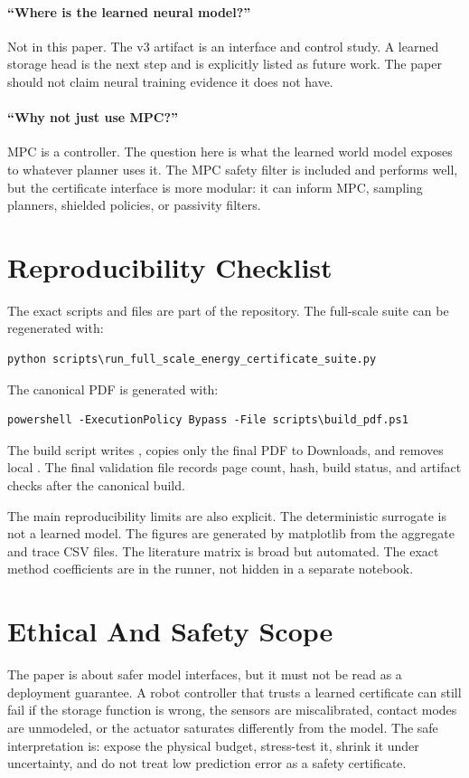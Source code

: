 \documentclass{article}
\begin{document}
\paragraph{``Where is the learned neural model?''}
Not in this paper. The v3 artifact is an interface and control study. A learned storage head is the next step and is explicitly listed as future work. The paper should not claim neural training evidence it does not have.

\paragraph{``Why not just use MPC?''}
MPC is a controller. The question here is what the learned world model exposes to whatever planner uses it. The MPC safety filter is included and performs well, but the certificate interface is more modular: it can inform MPC, sampling planners, shielded policies, or passivity filters.

\section{Reproducibility Checklist}

The exact scripts and files are part of the repository. The full-scale suite can be regenerated with:
\begin{verbatim}
python scripts\run_full_scale_energy_certificate_suite.py
\end{verbatim}
The canonical PDF is generated with:
\begin{verbatim}
powershell -ExecutionPolicy Bypass -File scripts\build_pdf.ps1
\end{verbatim}
The build script writes , copies only the final PDF to Downloads, and removes local . The final validation file records page count, hash, build status, and artifact checks after the canonical build.

The main reproducibility limits are also explicit. The deterministic surrogate is not a learned model. The figures are generated by matplotlib from the aggregate and trace CSV files. The literature matrix is broad but automated. The exact method coefficients are in the runner, not hidden in a separate notebook.

\section{Ethical And Safety Scope}

The paper is about safer model interfaces, but it must not be read as a deployment guarantee. A robot controller that trusts a learned certificate can still fail if the storage function is wrong, the sensors are miscalibrated, contact modes are unmodeled, or the actuator saturates differently from the model. The safe interpretation is: expose the physical budget, stress-test it, shrink it under uncertainty, and do not treat low prediction error as a safety certificate.
\end{document}
